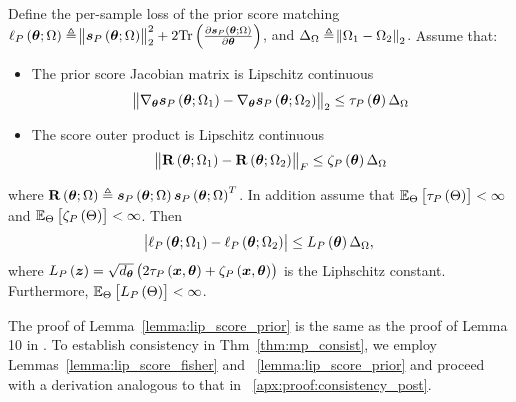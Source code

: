 \begin{lemma}\label{lemma:lip_score_prior}

    {Define the per-sample loss of the prior score matching $\ell_P\left(\bm{\theta};\Omega\right)\triangleq{\norm{\bm{s}_{P}\left(\bm{\theta};\Omega\right)}_2^2}+2\mathrm{Tr}\left(\frac{\partial \bm{s}_{P}\left(\bm{\theta};\Omega\right){}}{\partial\bm{\theta}}\right) $, and $\Delta_\Omega \triangleq  \norm{\Omega_{1}-\Omega_{2}}_2$. }
    Assume that: 
    \begin{itemize}
      \item {The prior} score {Jacobian matrix} is Lipschitz continuous 
      $$\norm{\nabla_{\bm{\theta}}\bm{s}_{P}\left(\bm{\theta};\Omega_1\right)-\nabla_{\bm{\theta}}\bm{s}_{P}\left(\bm{\theta};\Omega_2\right)}_2\leq \tau_P\left(\bm{\theta}\right)\Delta_\Omega$$
      \item {The score} outer product is Lipschitz continuous
      $$\norm{\mathbf{R}\left(\bm{\theta};\Omega_1\right)-\mathbf{R}\left(\bm{\theta};\Omega_2\right)}_F\leq \zeta_P\left(\bm{\theta}\right)\Delta_\Omega$$
  \end{itemize}
where $\mathbf{R}\left(\bm{\theta};\Omega\right) \triangleq\bm{s}_{P}\left(\bm{\theta};\Omega\right)\bm{s}_{P}\left(\bm{\theta};\Omega\right)^T$. {In addition assume that $\mathbb{E}_{\Theta}\left[\tau_P\left(\Theta\right)\right]<\infty$ and $\mathbb{E}_{\Theta}\left[\zeta_P\left(\Theta\right)\right]<\infty$.}
    Then
    \begin{equation}
        \abs{\ell_P\left(\bm{\theta};\Omega_{1}\right)-\ell_P\left(\bm{\theta};\Omega_{2}\right)}\leq L_P\left(\bm{\theta}\right)\Delta_\Omega,
    \end{equation}
    where $L_P\left(\bm{z}\right)=\sqrt{{d_{\bm{\theta}}}}\left(2\tau_P\left(\bm{x},\bm{\theta}\right)+\zeta_P\left(\bm{x},\bm{\theta}\right)\right)$ is the Liphschitz constant. {Furthermore, $\mathbb{E}_{\Theta}\left[L_P\left(\Theta\right)\right]<\infty$. }
\end{lemma}
The proof of Lemma~\ref{lemma:lip_score_prior} is the same as the proof of Lemma 10 in \cite{crafts2023bayesian}. 
To establish consistency in Thm~\ref{thm:mp_consist}, we employ Lemmas~\ref{lemma:lip_score_fisher} and ~\ref{lemma:lip_score_prior} and proceed with a derivation analogous to that in ~\ref{apx:proof:consistency_post}.



